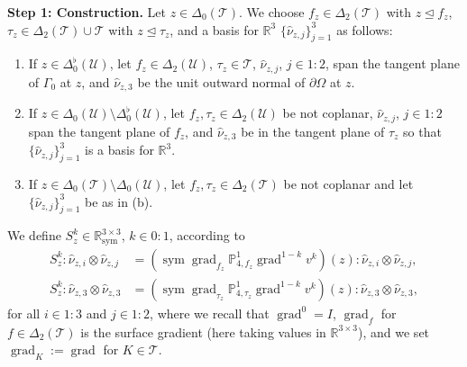 \documentclass{mcom-l}
\theoremstyle{definition}
\theoremstyle{remark}
\numberwithin{equation}{section}
\newcommand{\unitvec}[1]{\hat{#1}}
\DeclareMathOperator{\grad}{grad}
\DeclareMathOperator{\sym}{sym}
\DeclareMathOperator{\subsimplex}{\unlhd}
\newcommand{\mesh}[0]{\mathcal{T}}
\newcommand{\boundarymesh}[0]{\mathcal{U}}
\begin{document}
\noindent \textbf{Step 1: Construction. }
Let $z \in \Delta_0(\mesh)$. We choose $f_{z} \in \Delta_2(\mesh)$ with 
$z \subsimplex f_{z}$, $\tau_{z} \in \Delta_2(\mesh) \cup \mesh$
with $z \subsimplex \tau_{z}$, and a basis for $\mathbb{R}^3$ 
$\{ \unitvec{\nu}_{z, j} \}_{j=1}^{3}$ 
as follows:
\begin{enumerate}
	\item[(a)] If $z \in \Delta_0^{\flat}(\boundarymesh)$, let $f_{z} \in
	\Delta_2(\boundarymesh)$, $\tau_z \in \mesh$, $\unitvec{\nu}_{z, j}$,
	$j \in 1:2$, span the tangent plane of $\Gamma_0$ at $z$,
	and $\unitvec{\nu}_{z, 3}$ be the unit outward normal of $\partial \Omega$ 
	at $z$.
	
	\item[(b)] If $z \in \Delta_0(\boundarymesh) 
	\setminus \Delta_0^{\flat}(\boundarymesh)$, 
	let $f_{z}, \tau_{z} \in  \Delta_2(\boundarymesh)$ be not coplanar,
	$\unitvec{\nu}_{z, j}$, $j \in 1:2$ span the tangent plane of $f_z$,
	and $\unitvec{\nu}_{z, 3}$ be in the tangent plane of $\tau_z$
	so that $\{\unitvec{\nu}_{z, j}\}_{j=1}^{3}$ is a basis for $\mathbb{R}^3$. 
	
	\item[(c)] If $z \in \Delta_0(\mesh) \setminus \Delta_0(\boundarymesh)$, 
	let $f_z, \tau_z \in \Delta_2(\mesh)$ be not coplanar and let 
	$\{\unitvec{\nu}_{z, j}\}_{j=1}^{3}$ be as in (b).
\end{enumerate}
We define $S_z^k \in \mathbb{R}^{3\times 3}_{\sym}$, $k \in 0:1$, according to 
\begin{align*}
	S_z^k : \unitvec{\nu}_{z, i} \otimes \unitvec{\nu}_{z, j} &= 
	(\sym\grad_{f_{z}} \mathbb{P}_{4, f_{z}}^1 \grad^{1-k} v^k)(z) 
	: \unitvec{\nu}_{z, i} \otimes \unitvec{\nu}_{z, j}, \\
	S_z^k : \unitvec{\nu}_{z, 3} \otimes \unitvec{\nu}_{z, 3} &= 
	(\sym\grad_{\tau_z} \mathbb{P}_{4, \tau_{z}}^1 \grad^{1-k} v^k)(z) 
	: \unitvec{\nu}_{z, 3} \otimes \unitvec{\nu}_{z, 3}, 
\end{align*}
for all $i \in 1:3$ and $j \in 1:2$,
where we recall that $\grad^0 = I$,
$\grad_{f}$ for $f \in \Delta_2(\mesh)$ is the surface 
gradient (here taking values in $\mathbb{R}^{3 \times 3}$), and we set 
$\grad_K := \grad$ for $K \in \mesh$.
\end{document}
